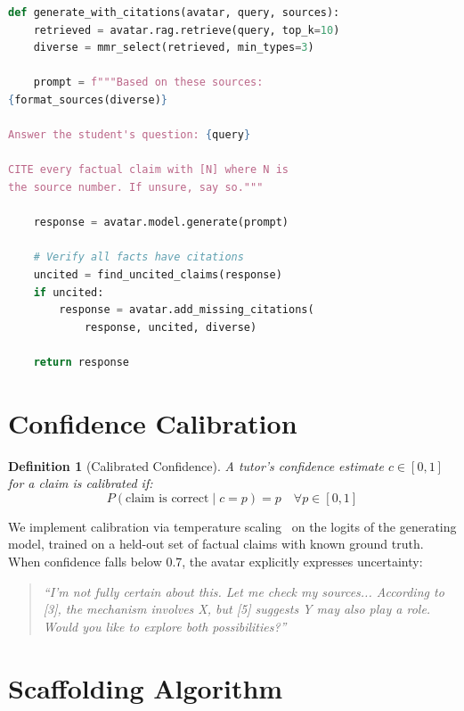 \documentclass[11pt,letterpaper]{article}
\newtheorem{definition}{Definition}[section]
\begin{document}
\begin{lstlisting}[language=Python,caption=Citation-enforced generation]
def generate_with_citations(avatar, query, sources):
    retrieved = avatar.rag.retrieve(query, top_k=10)
    diverse = mmr_select(retrieved, min_types=3)

    prompt = f"""Based on these sources:
{format_sources(diverse)}

Answer the student's question: {query}

CITE every factual claim with [N] where N is
the source number. If unsure, say so."""

    response = avatar.model.generate(prompt)

    # Verify all facts have citations
    uncited = find_uncited_claims(response)
    if uncited:
        response = avatar.add_missing_citations(
            response, uncited, diverse)

    return response
\end{lstlisting}

\section{Confidence Calibration}

\begin{definition}[Calibrated Confidence]
A tutor's confidence estimate $c \in [0,1]$ for a claim is \emph{calibrated} if:
\[
P(\text{claim is correct} \mid c = p) = p \quad \forall p \in [0,1]
\]
\end{definition}

We implement calibration via temperature scaling~\cite{guo2017calibration} on the logits of the generating model, trained on a held-out set of factual claims with known ground truth. When confidence falls below 0.7, the avatar explicitly expresses uncertainty:

\begin{quote}
\textit{``I'm not fully certain about this. Let me check my sources... According to [3], the mechanism involves X, but [5] suggests Y may also play a role. Would you like to explore both possibilities?''}
\end{quote}

\section{Scaffolding Algorithm}
\end{document}
